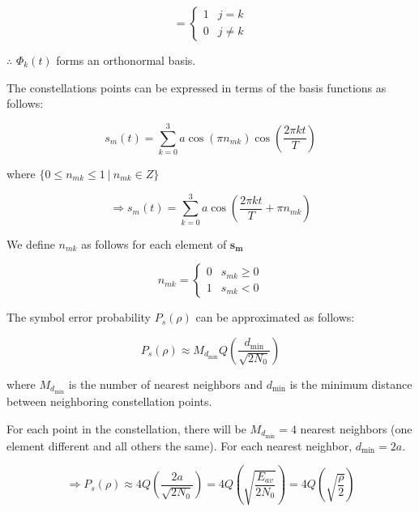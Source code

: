 \documentclass[fleqn]{article}
\begin{document}
\begin{enumerate}
		\begin{equation*}
			= \begin{cases}
				1 & j = k \\
				0 & j \neq k
			\end{cases}
		\end{equation*}
		
		$\therefore$ $\Phi_k(t)$ forms an orthonormal basis.
		
		The constellations points can be expressed in terms of the basis functions as follows:
		
		\begin{equation*}
			s_m(t) = \sum_{k=0}^{3}{a\cos({\pi}n_{mk})\cos\left(\frac{2{\pi}kt}{T}\right)}
		\end{equation*}
		
		where $\{0 \leq n_{mk} \leq 1\ \vert\ n_{mk} \in Z\}$
		
		\begin{equation*}
			\Rightarrow s_m(t) = \sum_{k=0}^{3}{a\cos\left(\frac{2{\pi}kt}{T}+{\pi}n_{mk}\right)}
		\end{equation*}
		
		We define $n_{mk}$ as follows for each element of $\mathbf{s_m}$
		
		\begin{equation*}
			n_{mk} = \begin{cases}
				0 & s_{mk} \geq 0\\
				1 & s_{mk} < 0
			\end{cases}
		\end{equation*}
		
		The symbol error probability $P_s(\rho)$ can be approximated as follows:
		
		\begin{equation*}
			P_s(\rho) \approx M_{d_\text{min}}Q\left(\frac{d_\text{min}}{\sqrt{2N_0}}\right)
		\end{equation*}
		
		where $M_{d_\text{min}}$ is the number of nearest neighbors and $d_\text{min}$ is the minimum distance between neighboring constellation points.
		
		For each point in the constellation, there will be $M_{d_\text{min}} = 4$ nearest neighbors (one element different and all others the same). For each nearest neighbor, $d_\text{min} = 2a$.
		
		\begin{equation*}
			\Rightarrow P_s(\rho) \approx 4Q\left(\frac{2a}{\sqrt{2N_0}}\right) = 4Q\left(\sqrt{\frac{E_{av}}{2N_0}}\right)= 4Q\left(\sqrt{\frac{\rho}{2}}\right)
		\end{equation*}
		

\end{enumerate}
\end{document}
